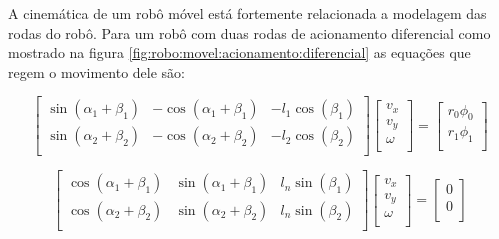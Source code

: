 A cinemática de um robô móvel está fortemente relacionada a modelagem
das rodas do robô. Para um robô com duas rodas de acionamento diferencial
como mostrado na figura \ref{fig:robo:movel:acionamento:diferencial}
as equações que regem o movimento dele são:

\begin{equation}\label{eq:cinmeatica:1}
    \begin{bmatrix}
        \sin(\alpha_{1} + \beta_{1}) &  -\cos(\alpha_{1} + \beta_{1}) &  -l_1\cos(\beta_{1})\\
        \sin(\alpha_{2} + \beta_{2}) &  -\cos(\alpha_{2} + \beta_{2}) &  -l_2\cos(\beta_{2})\\
    \end{bmatrix}
    \begin{bmatrix}
        v_x \\
        v_y \\
        \omega\\
    \end{bmatrix}
    =
    \begin{bmatrix}
        r_0\phi_0 \\
        r_1\phi_1 \\
    \end{bmatrix}
\end{equation}


\begin{equation}\label{eq:cinmeatica:2}
    \begin{bmatrix}
        \cos(\alpha_{1} + \beta_{1}) &  \sin(\alpha_{1} + \beta_{1}) &  l_n\sin(\beta_{1}) \\
        \cos(\alpha_{2} + \beta_{2}) &  \sin(\alpha_{2} + \beta_{2})  &  l_n\sin(\beta_{2})\\
    \end{bmatrix}
    \begin{bmatrix}
        v_x \\
        v_y \\
        \omega\\
    \end{bmatrix}
    =
    \begin{bmatrix}
        0 \\
        0 \\
    \end{bmatrix}
\end{equation}

